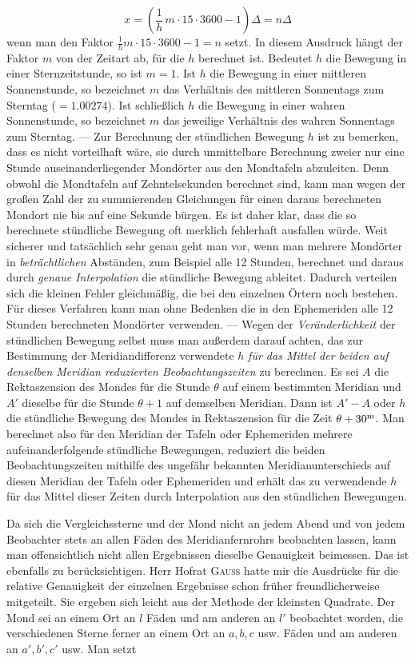 \[
x = \left(\frac{1}{h}\,m\cdot 15\cdot 3600 - 1\right)\Delta = n\Delta
\]
\noindent wenn man den Faktor $\frac{1}{h}m\cdot15\cdot3600-1=n$ setzt. In diesem Ausdruck hängt der Faktor $m$ von der Zeitart ab, für die $h$ berechnet ist. Bedeutet $h$ die Bewegung in einer Sternzeitstunde, so ist $m=1$. Ist $h$ die Bewegung in einer mittleren Sonnenstunde, so bezeichnet $m$ das Verhältnis des mittleren Sonnentags zum Sterntag ($=1.00274$). Ist schließlich $h$ die Bewegung in einer wahren Sonnenstunde, so bezeichnet $m$ das jeweilige Verhältnis des wahren Sonnentags zum Sterntag. --- Zur Berechnung der stündlichen Bewegung $h$ ist zu bemerken, dass es nicht vorteilhaft wäre, sie durch unmittelbare Berechnung zweier nur eine Stunde auseinanderliegender Mondörter aus den Mondtafeln abzuleiten. Denn obwohl die Mondtafeln auf Zehntelsekunden berechnet sind, kann man wegen der großen Zahl der zu summierenden Gleichungen für einen daraus berechneten Mondort nie bis auf eine Sekunde bürgen. Es ist daher klar, dass die so berechnete stündliche Bewegung oft merklich fehlerhaft ausfallen würde. Weit sicherer und tatsächlich sehr genau geht man vor, wenn man mehrere Mondörter in \emph{beträchtlichen} Abständen, zum Beispiel alle 12 Stunden, berechnet und daraus durch \emph{genaue Interpolation} die stündliche Bewegung ableitet. Dadurch verteilen sich die kleinen Fehler gleichmäßig, die bei den einzelnen Örtern noch bestehen. Für dieses Verfahren kann man ohne Bedenken die in den Ephemeriden alle 12 Stunden berechneten Mondörter verwenden. --- Wegen der \emph{Veränderlichkeit} der stündlichen Bewegung selbst muss man außerdem darauf achten, das zur Bestimmung der Meridiandifferenz verwendete $h$ \emph{für das Mittel der beiden auf denselben Meridian reduzierten Beobachtungszeiten} zu berechnen. Es sei $A$ die Rektaszension des Mondes für die Stunde $\theta$ auf einem bestimmten Meridian und $A'$ dieselbe für die Stunde $\theta+1$ auf demselben Meridian. Dann ist $A'-A$ oder $h$ die stündliche Bewegung des Mondes in Rektaszension für die Zeit $\theta+30^{\rm m}$. Man berechnet also für den Meridian der Tafeln oder Ephemeriden mehrere aufeinanderfolgende stündliche Bewegungen, reduziert die beiden Beobachtungszeiten mithilfe des ungefähr bekannten Meridianunterschieds auf diesen Meridian der Tafeln oder Ephemeriden und erhält das zu verwendende $h$ für das Mittel dieser Zeiten durch Interpolation aus den stündlichen Bewegungen.

Da sich die Vergleichssterne und der Mond nicht an jedem Abend und von jedem Beobachter stets an allen Fäden des Meridianfernrohrs beobachten lassen, kann man offensichtlich nicht allen Ergebnissen dieselbe Genauigkeit beimessen. Das ist ebenfalls zu berücksichtigen. Herr Hofrat \textsc{Gauss} hatte mir die Ausdrücke für die relative Genauigkeit der einzelnen Ergebnisse schon früher freundlicherweise mitgeteilt. Sie ergeben sich leicht aus der Methode der kleinsten Quadrate. Der Mond sei an einem Ort an $l$ Fäden und am anderen an $l'$ beobachtet worden, die verschiedenen Sterne ferner an einem Ort an $a, b, c$ usw. Fäden und am anderen an $a', b', c'$ usw. Man setzt

